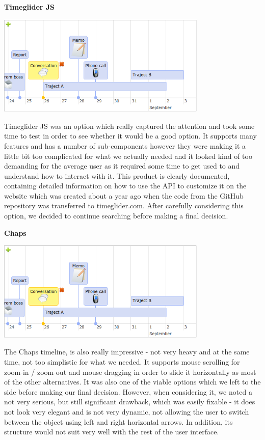 \documentclass{l3proj}
\begin{document}
\textbf{Timeglider JS}

\includegraphics[width=0.75\textwidth]{images/Timeglider.png}

Timeglider JS was an option which really captured the attention and took some time to test in order to see whether it would be a good option. It supports many features and has a number of sub-components however they were making it a little bit too complicated for what we actually needed and it looked kind of too demanding for the average user as it required some time to get used to and understand how to interact with it. This product is clearly documented, containing detailed information on how to use the API to customize it on the website which was created about a year ago when the code from the GitHub repository was transferred to timeglider.com. After carefully considering this option, we decided to continue searching before making a final decision.


\textbf{Chaps}

\includegraphics[width=0.75\textwidth]{images/Chaps.png}

The Chaps timeline, is also really impressive - not very heavy and at the same time, not too simplistic for what we needed. It supports mouse scrolling for zoom-in / zoom-out and mouse dragging in order to slide it horizontally as most of the other alternatives. It was also one of the viable options which we left to the side before making our final decision. However, when considering it, we noted a not very serious, but still significant drawback, which was easily fixable - it does not look very elegant and is not very dynamic, not allowing the user to switch between the object using left and right horizontal arrows. In addition, its structure would not suit very well with the rest of the user interface.
\end{document}
